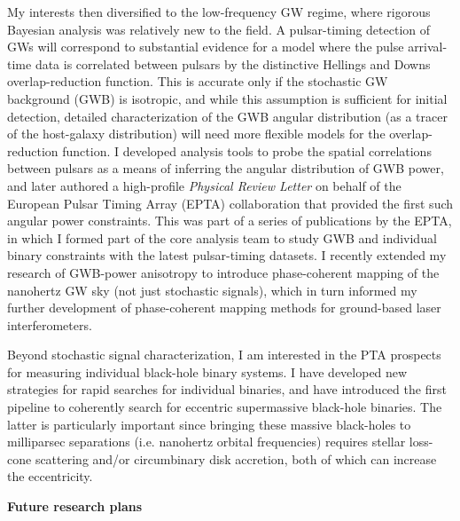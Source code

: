 \documentclass[11pt,letterpaper,sans]{moderncv} %
\begin{document}
My interests then diversified to the low-frequency GW regime, where rigorous Bayesian analysis was relatively new to the field. A pulsar-timing detection of GWs will correspond to substantial evidence for a model where the pulse arrival-time data is correlated between pulsars by the distinctive Hellings and Downs overlap-reduction function. This is accurate only if the stochastic GW background (GWB) is isotropic, and while this assumption is sufficient for initial detection, detailed characterization of the GWB angular distribution (as a tracer of the host-galaxy distribution) will need more flexible models for the overlap-reduction function. I developed analysis tools to probe the spatial correlations between pulsars as a means of inferring the angular distribution of GWB power, and later authored a high-profile \textit{Physical Review Letter} on behalf of the European Pulsar Timing Array (EPTA) collaboration that provided the first such angular power constraints. This was part of a series of publications by the EPTA, in which I formed part of the core analysis team to study GWB and individual binary constraints with the latest pulsar-timing datasets. I recently extended my research of GWB-power anisotropy to introduce phase-coherent mapping of the nanohertz GW sky (not just stochastic signals), which in turn informed my further development of phase-coherent mapping methods for ground-based laser interferometers.
\vspace{1mm}

Beyond stochastic signal characterization, I am interested in the PTA prospects for measuring individual black-hole binary systems. I have developed new strategies for rapid searches for individual binaries, and have introduced the first pipeline to coherently search for eccentric supermassive black-hole binaries. The latter is particularly important since bringing these massive black-holes to milliparsec separations (i.e. nanohertz orbital frequencies) requires stellar loss-cone scattering and/or circumbinary disk accretion, both of which can increase the eccentricity.
\vspace{1mm}

\textbf{Future research plans}
\vspace{1mm}
\end{document}
